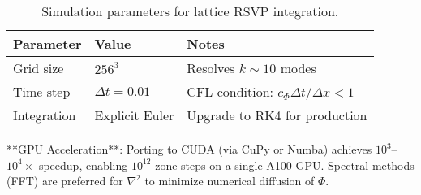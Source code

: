 \documentclass[12pt,a4paper]{article}
\begin{document}
\begin{table}[h]
\centering
\begin{tabular}{@{}lll@{}}
\toprule
\textbf{Parameter} & \textbf{Value} & \textbf{Notes} \\
\midrule
Grid size & $256^3$ & Resolves $k \sim 10$ modes \\
Time step & $\Delta t = 0.01$ & CFL condition: $c_\Phi \Delta t / \Delta x < 1$ \\
Integration & Explicit Euler & Upgrade to RK4 for production \\
\bottomrule
\end{tabular}
\caption{Simulation parameters for lattice RSVP integration.}
\label{tab:sim-params}
\end{table}

**GPU Acceleration**: Porting to CUDA (via CuPy or Numba) achieves $10^3$--$10^4\times$ speedup, enabling $10^{12}$ zone-steps on a single A100 GPU. Spectral methods (FFT) are preferred for $\nabla^2$ to minimize numerical diffusion of $\Phi$.
\end{document}
